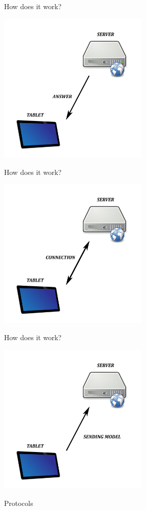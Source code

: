 \documentclass[a4paper,10pt]{beamer}
\begin{document}
		\begin{frame}{How does it work?}
			\centerline{\includegraphics[height=205pt]{images/answer.png}}
		\end{frame}
		
		\begin{frame}{How does it work?}
			\centerline{\includegraphics[height=205pt]{images/connection.png}}
		\end{frame}
		
		\begin{frame}{How does it work?}
			\centerline{\includegraphics[height=205pt]{images/sending_model.png}}
		\end{frame}
		
		\begin{frame}{Protocols}
			
		\end{frame}
	
\end{document}
